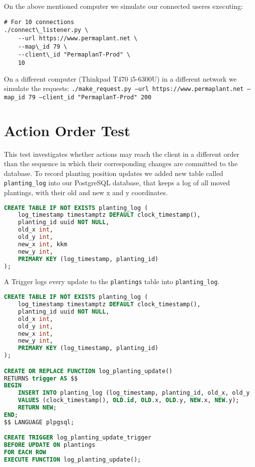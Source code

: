 \documentclass[final,draft,oneside]{vutinfth}
\begin{document}
On the above mentioned computer we simulate our connected useres executing: 
\begin{verbatim}
# For 10 connections
./connect\_listener.py \
    --url https://www.permaplant.net \
    --map\_id 79 \
    --client\_id "PermaplanT-Prod" \
    10 
\end{verbatim}

On a different computer (Thinkpad T470 i5-6300U) in a different network we simulate the requests:
\texttt{./make\_request.py --url https://www.permaplant.net --map\_id 79 --client\_id "PermaplanT-Prod" 200}

\section{Action Order Test}

This test investigates whether actions may reach the client in a different order than the sequence in which their corresponding changes are committed to the database.
To record planting position updates we added new table called \texttt{planting\_log} into our PostgreSQL database, that keeps a log of all moved plantings, with their old and new x and y coordinates.

\begin{lstlisting}[language=sql]
CREATE TABLE IF NOT EXISTS planting_log (
    log_timestamp timestamptz DEFAULT clock_timestamp(),
    planting_id uuid NOT NULL,
    old_x int,
    old_y int,
    new_x int, kkm
    new_y int,
    PRIMARY KEY (log_timestamp, planting_id)
);
\end{lstlisting}

A Trigger logs every update to the \texttt{plantings} table into \texttt{planting\_log}.

\begin{lstlisting}[language=sql]
CREATE TABLE IF NOT EXISTS planting_log (
    log_timestamp timestamptz DEFAULT clock_timestamp(),
    planting_id uuid NOT NULL,
    old_x int,
    old_y int,
    new_x int,
    new_y int,
    PRIMARY KEY (log_timestamp, planting_id)
);

CREATE OR REPLACE FUNCTION log_planting_update()
RETURNS trigger AS $$
BEGIN
    INSERT INTO planting_log (log_timestamp, planting_id, old_x, old_y, new_x, new_y)
    VALUES (clock_timestamp(), OLD.id, OLD.x, OLD.y, NEW.x, NEW.y);
    RETURN NEW;
END;
$$ LANGUAGE plpgsql;

CREATE TRIGGER log_planting_update_trigger
BEFORE UPDATE ON plantings
FOR EACH ROW
EXECUTE FUNCTION log_planting_update();
\end{lstlisting}
\end{document}
